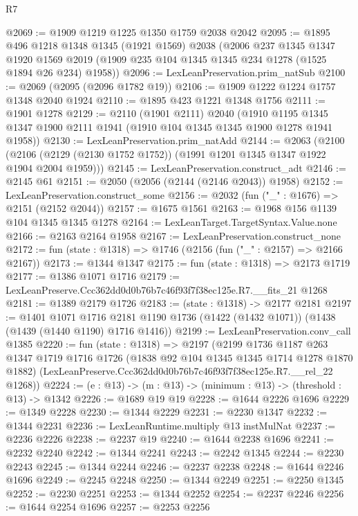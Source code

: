 \begin{lexlean}{R7}
\begin{coremodule}
@2069 := @1909 @1219 @1225 @1350 @1759 @2038 @2042
@2095 := @1895
    @496
    @1218
    @1348
    @1345
    (@1921 @1569)
    @2038
    (@2006
      @237
      @1345
      @1347
      @1920
      @1569
      @2019
      (@1909 @235 @104 @1345 @1345 @234 @1278 (@1525 @1894 @26 @234) @1958))
@2096 := LexLeanPreservation.prim_natSub
@2100 := @2069 (@2095 (@2096 @1782 @19))
@2106 := @1909 @1222 @1224 @1757 @1348 @2040 @1924
@2110 := @1895 @423 @1221 @1348 @1756
@2111 := @1901 @1278
@2129 := @2110
    (@1901 @2111)
    @2040
    (@1910 @1195 @1345 @1347 @1900 @2111 @1941 (@1910 @104 @1345 @1345 @1900 @1278 @1941 @1958))
@2130 := LexLeanPreservation.prim_natAdd
@2144 := @2063
    (@2100 (@2106 (@2129 (@2130 @1752 @1752)) (@1991 @1201 @1345 @1347 @1922 @1904 @2004 @1959)))
@2145 := LexLeanPreservation.construct_adt
@2146 := @2145 @61
@2151 := @2050 (@2056 (@2144 (@2146 @2043)) @1958)
@2152 := LexLeanPreservation.construct_some
@2156 := @2032 (fun ("_" : @1676) => @2151 (@2152 @2044))
@2157 := @1675 @1561
@2163 := @1968 @156 @1139 @104 @1345 @1345 @1278
@2164 := LexLeanTarget.TargetSyntax.Value.none
@2166 := @2163 @2164 @1958
@2167 := LexLeanPreservation.construct_none
@2172 := fun (state : @1318) => @1746 (@2156 (fun ("_" : @2157) => @2166 @2167))
@2173 := @1344 @1347
@2175 := fun (state : @1318) => @2173 @1719
@2177 := @1386 @1071 @1716
@2179 := LexLeanPreserve.Ccc362dd0d0b76b7c46f93f7f38ec125e.R7.__fits_21 @1268
@2181 := @1389 @2179 @1726
@2183 := (state : @1318) -> @2177 @2181
@2197 := @1401
    @1071
    @1716
    @2181
    @1190
    @1736
    (@1422 (@1432 @1071))
    (@1438 (@1439 (@1440 @1190) @1716 @1416))
@2199 := LexLeanPreservation.conv_call @1385
@2220 := fun (state : @1318) =>
  @2197
    (@2199
      @1736
      @1187
      @263
      @1347
      @1719
      @1716
      @1726
      (@1838 @92 @104 @1345 @1345 @1714 @1278 @1870 @1882)
      (LexLeanPreserve.Ccc362dd0d0b76b7c46f93f7f38ec125e.R7.__rel_22 @1268))
@2224 := (e : @13) -> (m : @13) -> (minimum : @13) -> (threshold : @13) -> @1342
@2226 := @1689 @19 @19
@2228 := @1644 @2226 @1696
@2229 := @1349 @2228
@2230 := @1344 @2229
@2231 := @2230 @1347
@2232 := @1344 @2231
@2236 := LexLeanRuntime.multiply @13 instMulNat
@2237 := @2236 @2226
@2238 := @2237 @19
@2240 := @1644 @2238 @1696
@2241 := @2232 @2240
@2242 := @1344 @2241
@2243 := @2242 @1345
@2244 := @2230 @2243
@2245 := @1344 @2244
@2246 := @2237 @2238
@2248 := @1644 @2246 @1696
@2249 := @2245 @2248
@2250 := @1344 @2249
@2251 := @2250 @1345
@2252 := @2230 @2251
@2253 := @1344 @2252
@2254 := @2237 @2246
@2256 := @1644 @2254 @1696
@2257 := @2253 @2256

\end{coremodule}
\end{lexlean}
